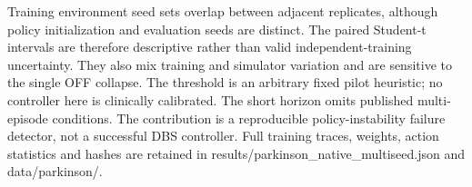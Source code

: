 Training environment seed sets overlap between adjacent replicates, although policy initialization and evaluation seeds are distinct. The paired Student-t intervals are therefore descriptive rather than valid independent-training uncertainty. They also mix training and simulator variation and are sensitive to the single OFF collapse. The threshold is an arbitrary fixed pilot heuristic; no controller here is clinically calibrated. The short horizon omits published multi-episode conditions. The contribution is a reproducible policy-instability failure detector, not a successful DBS controller. Full training traces, weights, action statistics and hashes are retained in results/parkinson\_native\_multiseed.json and data/parkinson/.